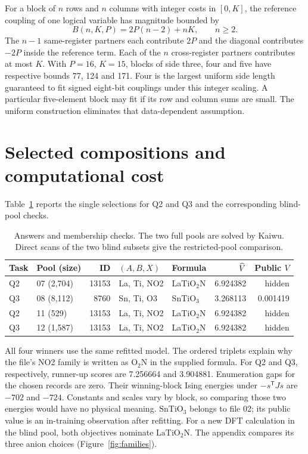For a block of $n$ rows and $n$ columns with integer costs in $[0,K]$, the reference coupling of one logical variable has magnitude bounded by
\[
 B(n,K,P)=2P(n-2)+nK,\qquad n\geq2 .
\]
The $n-1$ same-register partners each contribute $2P$ and the diagonal contributes $-2P$ inside the reference term. Each of the $n$ cross-register partners contributes at most $K$. With $P=16$, $K=15$, blocks of side three, four and five have respective bounds 77, 124 and 171. Four is the largest uniform side length guaranteed to fit signed eight-bit couplings under this integer scaling. A particular five-element block may fit if its row and column sums are small. The uniform construction eliminates that data-dependent assumption.

\section{Selected compositions and computational cost}
Table~\ref{tab:answers} reports the single selections for Q2 and Q3 and the corresponding blind-pool checks.
\begin{table}[htbp]
\caption{Answers and membership checks. The two full pools are solved by Kaiwu. Direct scans of the two blind subsets give the restricted-pool comparison.}\label{tab:answers}
\centering\small\begin{tabular}{llrllrr}
\toprule Task & Pool (size) & ID & $(A,B,X)$ & Formula & $\widehat V$ & Public $V$\\\midrule
Q2 & 07 (2,704)&13153& La, Ti, NO2 & LaTiO$_2$N & 6.924382 & hidden\\
Q3 & 08 (8,112)&8760& Sn, Ti, O3 & SnTiO$_3$ & 3.268113 & 0.001419\\\midrule
Q2 & 11 (529)&13153& La, Ti, NO2 & LaTiO$_2$N & 6.924382 & hidden\\
Q3 & 12 (1,587)&13153& La, Ti, NO2 & LaTiO$_2$N & 6.924382 & hidden\\\bottomrule
\end{tabular}
\end{table}
All four winners use the same refitted model. The ordered triplets explain why the file's NO2 family is written as O$_2$N in the supplied formula. For Q2 and Q3, respectively, runner-up scores are 7.256664 and 3.904881. Enumeration gaps for the chosen records are zero. Their winning-block Ising energies under $-s^\mathsf{T}Js$ are $-702$ and $-724$. Constants and scales vary by block, so comparing those two energies would have no physical meaning. $\mathrm{SnTiO_3}$ belongs to file 02; its public value is an in-training observation after refitting. For a new DFT calculation in the blind pool, both objectives nominate $\mathrm{LaTiO_2N}$. The appendix compares its three anion choices (Figure~\ref{fig:families}).

